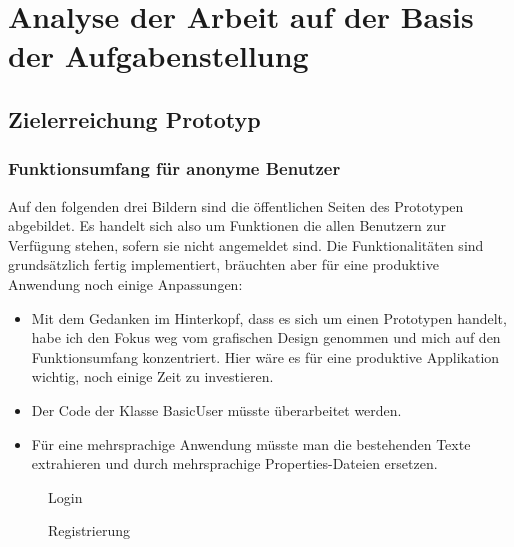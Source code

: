 
\chapter{Analyse der Arbeit auf der Basis der Aufgabenstellung}\label{analyse}
\section{Zielerreichung Prototyp}
\subsection{Funktionsumfang f\"ur anonyme Benutzer}

Auf den folgenden drei Bildern sind die \"offentlichen Seiten des Prototypen abgebildet. Es handelt sich also um Funktionen die allen Benutzern zur Verf\"ugung stehen, sofern sie nicht angemeldet sind. Die Funktionalit\"aten sind grunds\"atzlich fertig implementiert, br\"auchten aber f\"ur eine produktive Anwendung noch einige Anpassungen:
\begin{itemize}
\item Mit dem Gedanken im Hinterkopf, dass es sich um einen Prototypen handelt, habe ich den Fokus weg vom grafischen Design genommen und mich auf den Funktionsumfang konzentriert. Hier w\"are es f\"ur eine produktive Applikation wichtig, noch einige Zeit zu investieren.
\item Der Code der Klasse BasicUser m\"usste \"uberarbeitet werden.
\item F\"ur eine mehrsprachige Anwendung m\"usste man die bestehenden Texte extrahieren und durch mehrsprachige Properties-Dateien ersetzen.
\end{itemize}

\begin{figure}[H]
  	\centering
        	\caption{Login}
\end{figure}

\begin{figure}[H]
  	\centering
        	\caption{Registrierung}
\end{figure}

